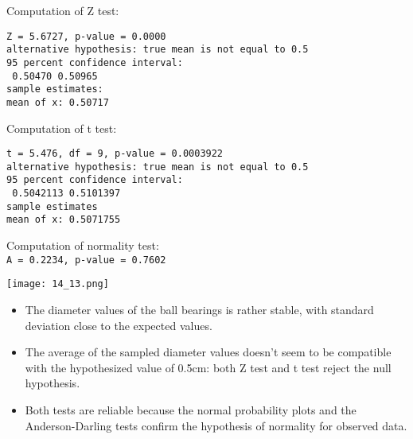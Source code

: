 \begin{frame}[fragile]
  Computation of Z test:
  \begin{verbatim}
Z = 5.6727, p-value = 0.0000
alternative hypothesis: true mean is not equal to 0.5
95 percent confidence interval:
 0.50470 0.50965 
sample estimates:
mean of x: 0.50717
  \end{verbatim}
\end{frame}

\begin{frame}[fragile]
  Computation of t test:
  \begin{verbatim}
t = 5.476, df = 9, p-value = 0.0003922
alternative hypothesis: true mean is not equal to 0.5
95 percent confidence interval:
 0.5042113 0.5101397
sample estimates
mean of x: 0.5071755
  \end{verbatim}
\end{frame}

\begin{frame}
  Computation of normality test:\\
  \texttt{A = 0.2234, p-value = 0.7602}
  \vspace{.3cm}
  \begin{center}
    \texttt{[image: 14\_13.png]}
  \end{center}
\end{frame}

\begin{frame}
  \begin{itemize}
    \item The diameter values of the ball bearings is rather stable, with standard deviation close to the expected values.
    \vspace{0.5cm}
    \item The average of the sampled diameter values doesn't seem to be compatible with the hypothesized value of 0.5cm: both Z test and t test reject the null hypothesis.
    \vspace{0.5cm}
    \item Both tests are reliable because the normal probability plots and the Anderson-Darling tests confirm the hypothesis of normality for observed data.
  \end{itemize}
\end{frame}


